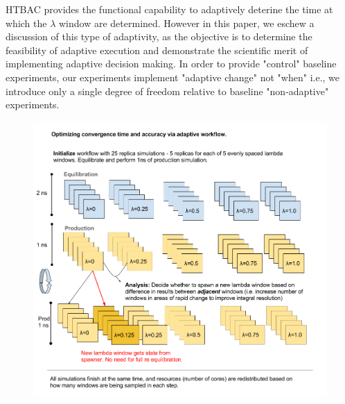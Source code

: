 

HTBAC provides the functional capability to adaptively deterine the time at
which the $\lambda$ window are determined. However in this paper, we eschew a
discussion of this type of adaptivity, as the objective is to determine the
feasibility of adaptive execution and demonstrate the scientific merit of
implementing adaptive decision making. In order to provide "control" baseline
experiments, our experiments implement "adaptive change" not "when" i.e., we
introduce only a single degree of freedom relative to baseline "non-adaptive"
experiments.

\begin{figure}
  \centering
   \includegraphics[width=\columnwidth]{figures/Adaptive_TIES.png}
  \caption{}
\label{fig:adaptive_TIES}
\end{figure}

